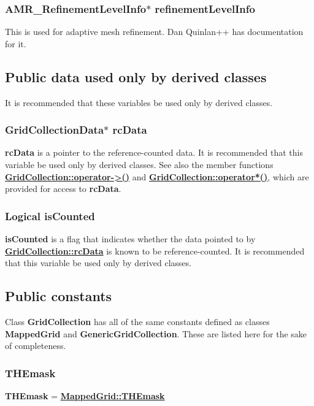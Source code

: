 \documentclass{article}
\begin{document}
  \subsubsection{AMR\_RefinementLevelInfo$\ast$ refinementLevelInfo}
  \label{MappedGrid::refinementLevelInfo}
    This is used for adaptive mesh refinement.  Dan Quinlan++ has documentation for it.

\subsection{Public data used only by derived classes}
\label{GridCollection::PublicDerivedClassData}

It is recommended that these variables be used only by derived classes.

  \subsubsection{GridCollectionData$*$ rcData}
  \label{GridCollection::rcData}
    \textbf{rcData} is a pointer to the reference-counted data.
    It is recommended that this variable be used only by derived classes.
    See also the member functions
    {\bf{}\hyperref{operator${-}{>}$()}{operator${-}{>}$() \rm(\S}{)}{GridCollection::operator->()}}
    and {\bf{}\hyperref{operator$*$()}{operator$*$() \rm(\S}{)}{GridCollection::operator*()}},
    which are provided for access to \textbf{rcData}.

  \subsubsection{Logical isCounted}
  \label{GridCollection::isCounted}
    \textbf{isCounted} is
    a flag that indicates whether the data pointed to by {\bf{}\hyperref{rcData}{rcData \rm(\S}{)}{GridCollection::rcData}} is known to be reference-counted.
    It is recommended that this variable be used only by derived classes.

\subsection{Public constants}
\label{GridCollection::PublicConstants}

  Class \textbf{GridCollection} has all of the same constants defined as classes \textbf{MappedGrid} and \textbf{GenericGridCollection}.
  These are listed here for the sake of completeness.

  \subsubsection{THEmask}
  \label{GridCollection::THEmask}
    \textbf{THEmask} = {\bf{}\hyperref{MappedGrid::THEmask}{MappedGrid::THEmask \rm(\S}{)}{MappedGrid::THEmask}}
\end{document}
